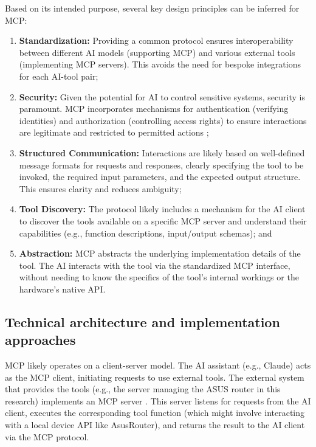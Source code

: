 Based on its intended purpose, several key design principles can be inferred for MCP:

\begin{enumerate}
\item \textbf{Standardization:} Providing a common protocol ensures interoperability between different AI models (supporting MCP) and various external tools (implementing MCP servers). This avoids the need for bespoke integrations for each AI-tool pair;

\item \textbf{Security:} Given the potential for AI to control sensitive systems, security is paramount. MCP incorporates mechanisms for authentication (verifying identities) and authorization (controlling access rights) to ensure interactions are legitimate and restricted to permitted actions \cite{mcp_docs};

\item \textbf{Structured Communication:} Interactions are likely based on well-defined message formats for requests and responses, clearly specifying the tool to be invoked, the required input parameters, and the expected output structure. This ensures clarity and reduces ambiguity;

\item \textbf{Tool Discovery:} The protocol likely includes a mechanism for the AI client to discover the tools available on a specific MCP server and understand their capabilities (e.g., function descriptions, input/output schemas); and

\item \textbf{Abstraction:} MCP abstracts the underlying implementation details of the tool. The AI interacts with the tool via the standardized MCP interface, without needing to know the specifics of the tool's internal workings or the hardware's native API.
\end{enumerate}

\subsection{Technical architecture and implementation approaches}
MCP likely operates on a client-server model. The AI assistant (e.g., Claude) acts as the MCP client, initiating requests to use external tools. The external system that provides the tools (e.g., the server managing the ASUS router in this research) implements an MCP server \cite{mcp_docs}. This server listens for requests from the AI client, executes the corresponding tool function (which might involve interacting with a local device API like AsusRouter), and returns the result to the AI client via the MCP protocol.

